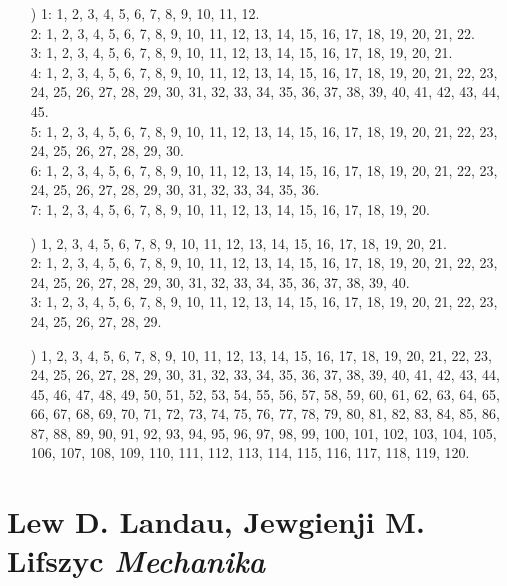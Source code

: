 \documentclass[a4paper,11pt]{article}
\numberwithin{equation}{section}
\begin{document}
\begin{itemize}
\item[\romannumeral4)] 1: 1, 2, 3, 4, 5, 6, 7, 8, 9, 10, 11, 12. \\
  2: 1, 2, 3, 4, 5, 6, 7, 8, 9, 10, 11, 12, 13, 14, 15, 16, 17, 18, 19, 20,
  21, 22. \\
  3: 1, 2, 3, 4, 5, 6, 7, 8, 9, 10, 11, 12, 13, 14, 15, 16, 17, 18, 19, 20,
  21. \\
  4: 1, 2, 3, 4, 5, 6, 7, 8, 9, 10, 11, 12, 13, 14, 15, 16, 17, 18, 19, 20,
  21, 22, 23, 24, 25, 26, 27, 28, 29, 30, 31, 32, 33, 34, 35, 36, 37, 38,
  39, 40, 41, 42, 43, 44, 45. \\
  5: 1, 2, 3, 4, 5, 6, 7, 8, 9, 10, 11, 12, 13, 14, 15, 16, 17, 18, 19, 20,
  21, 22, 23, 24, 25, 26, 27, 28, 29, 30. \\
  6: 1, 2, 3, 4, 5, 6, 7, 8, 9, 10, 11, 12, 13, 14, 15, 16, 17, 18, 19, 20,
  21, 22, 23, 24, 25, 26, 27, 28, 29, 30, 31, 32, 33, 34, 35, 36. \\
  7: 1, 2, 3, 4, 5, 6, 7, 8, 9, 10, 11, 12, 13, 14, 15, 16, 17, 18, 19, 20.

\item[\romannumeral5)] 1, 2, 3, 4, 5, 6, 7, 8, 9, 10, 11, 12, 13, 14, 15,
  16, 17, 18, 19, 20, 21. \\
  2: 1, 2, 3, 4, 5, 6, 7, 8, 9, 10, 11, 12, 13, 14, 15, 16, 17, 18, 19, 20,
  21, 22, 23, 24, 25, 26, 27, 28, 29, 30, 31, 32, 33, 34, 35, 36, 37, 38,
  39, 40. \\
  3: 1, 2, 3, 4, 5, 6, 7, 8, 9, 10, 11, 12, 13, 14, 15, 16, 17, 18, 19, 20,
  21, 22, 23, 24, 25, 26, 27, 28, 29.

\item[\romannumeral6)] 1, 2, 3, 4, 5, 6, 7, 8, 9, 10, 11, 12, 13, 14, 15,
  16, 17, 18, 19, 20, 21, 22, 23, 24, 25, 26, 27, 28, 29, 30, 31, 32, 33,
  34, 35, 36, 37, 38, 39, 40, 41, 42, 43, 44, 45, 46, 47, 48, 49, 50, 51,
  52, 53, 54, 55, 56, 57, 58, 59, 60, 61, 62, 63, 64, 65, 66, 67, 68, 69,
  70, 71, 72, 73, 74, 75, 76, 77, 78, 79, 80, 81, 82, 83, 84, 85, 86, 87,
  88, 89, 90, 91, 92, 93, 94, 95, 96, 97, 98, 99, 100, 101, 102, 103, 104,
  105, 106, 107, 108, 109, 110, 111, 112, 113, 114, 115, 116, 117, 118, 119,
  120.

\end{itemize}










\section{Lew D. Landau, Jewgienji M. Lifszyc
  \textit{Mechanika} %
}
\end{document}
